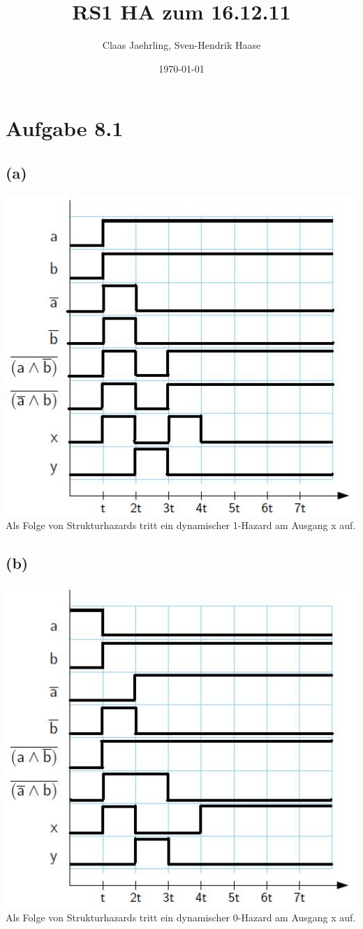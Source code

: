 \documentclass[12pt]{article}
\author{Claas Jaehrling, Sven-Hendrik Haase}
\title{RS1 HA zum 16.12.11}
\date{\today}
\begin{document}
\setcounter{secnumdepth}{0}
\maketitle

\section{Aufgabe 8.1}
\subsection{(a)}
\includegraphics{Impulsdiagramm81a}\\
Als Folge von Strukturhazards tritt ein dynamischer 1-Hazard am Ausgang x auf.
\subsection{(b)}
\includegraphics{Impulsdiagramm81b}\\
Als Folge von Strukturhazards tritt ein dynamischer 0-Hazard am Ausgang x auf.
\end{document}
